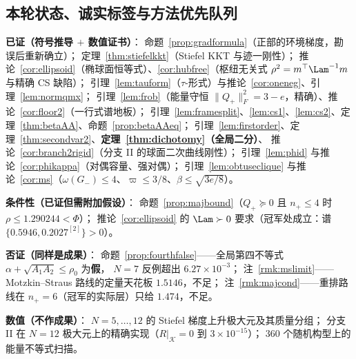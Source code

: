 \subsection{本轮状态、诚实标签与方法优先队列}\label{sec:r1517:status}

\textbf{已证（符号推导 $+$ 数值证书）}：
命题~\ref{prop:gradformula}（正部的环境梯度，勘误后重新确立）；
定理~\ref{thm:stiefelkkt}（Stiefel KKT 与迹一刚性）；
推论~\ref{cor:ellipsoid}（椭球面恒等式）、\ref{cor:hubfree}（枢纽无关式 $\rho^2=m^\top\Lam^{-1}m$ 与精确 CS 缺陷）；
引理~\ref{lem:tauform}（$\tau$-形式）与推论~\ref{cor:oneneg}、引理~\ref{lem:normqmx}；
引理~\ref{lem:frob}（能量守恒 $\|Q_+\|_F^2=3-e$，精确）、推论~\ref{cor:floor2}（一行式谱地板）；
引理~\ref{lem:framesplit}、\ref{lem:cs1}、\ref{lem:cs2}、定理~\ref{thm:betaAA}、命题~\ref{prop:betaAAeq}；
引理~\ref{lem:firstorder}、定理~\ref{thm:secondvar2}、\textbf{定理~\ref{thm:dichotomy}（全局二分）}、
推论~\ref{cor:branch2rigid}（分支 II 的球面二次曲线刚性）；
引理~\ref{lem:phid} 与推论~\ref{cor:phikappa}（对偶容量、强对偶）；
引理~\ref{lem:obtuseclique} 与推论~\ref{cor:ms}（$\omega(G_-)\le4$、$\varpi\le3/8$、$\beta\le\sqrt{3e/8}$）。

\textbf{条件性（已证但需附加假设）}：
命题~\ref{prop:majbound}（$Q_+\succeq0$ 且 $n_+\le4$ 时 $\rho\le1.290244<\Phi$）；
推论~\ref{cor:ellipsoid} 的 $\Lam\succ0$ 要求（冠军处成立：谱 $\{0.5946,0.2027^{[2]}\}>0$）。

\textbf{否证（同样是成果）}：
命题~\ref{prop:fourthfalse}——全局第四不等式 $\alpha+\sqrt{A_1A_2}\le\rho_0$ 为\textbf{假}，
$N=7$ 反例超出 $6.27\times10^{-3}$；
注~\ref{rmk:mslimit}——Motzkin--Straus 路线的定量天花板 $1.5146$，不足；
注~\ref{rmk:majcond}——重排路线在 $n_+=6$（冠军的实际层）只给 $1.474$，不足。

\textbf{数值（不作成果）}：
$N=5,\dots,12$ 的 Stiefel 梯度上升极大元及其质量分组；
分支 II 在 $N=12$ 极大元上的精确实现（$R|_{\mathcal K}=0$ 到 $3\times10^{-15}$）；
$360$ 个随机构型上的能量不等式扫描。

